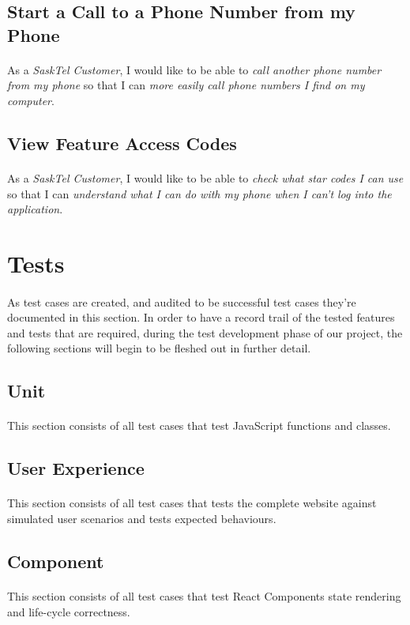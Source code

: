 \documentclass[12pt]{article}
\begin{document}
\subsection{Start a Call to a Phone Number from my Phone}
\paragraph{}	As a \textit{SaskTel Customer}, I would like to be able to \textit{call another phone number from my phone} so that I can \textit{more easily call phone numbers I find on my computer}.

\subsection{View Feature Access Codes}
\paragraph{}	As a \textit{SaskTel Customer}, I would like to be able to \textit{check what star codes I can use} so that I can \textit{understand what I can do with my phone when I can't log into the application}.

\newpage
\section{Tests}
\paragraph{}	As test cases are created, and audited to be successful test cases they're documented in this section. In order to have a record trail of the tested features and tests that are required, during the test development phase of our project, the following sections will begin to be fleshed out in further detail.

\subsection{Unit}
\paragraph{}	This section consists of all test cases that test JavaScript functions and classes.

\subsection{User Experience} 
\paragraph{}	This section consists of all test cases that tests the complete website against simulated user scenarios and tests expected behaviours.

\subsection{Component}
\paragraph{}	This section consists of all test cases that test React Components state rendering and life-cycle correctness.
\end{document}
